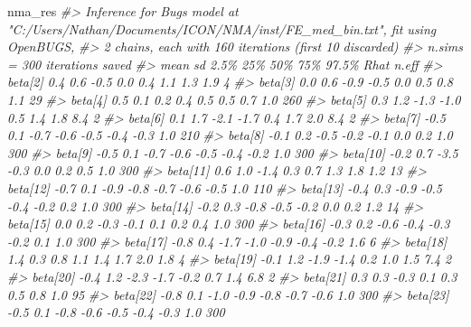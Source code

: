 \documentclass[
]{article}
\newenvironment{Shaded}{\begin{snugshade}}{\end{snugshade}}
\newcommand{\CommentTok}[1]{\textcolor[rgb]{0.56,0.35,0.01}{\textit{#1}}}
\newcommand{\NormalTok}[1]{#1}
\begin{document}
\begin{Shaded}
\begin{Highlighting}[]
\NormalTok{nma\_res}
\CommentTok{\#\textgreater{} Inference for Bugs model at "C:/Users/Nathan/Documents/ICON/NMA/inst/FE\_med\_bin.txt", fit using OpenBUGS,}
\CommentTok{\#\textgreater{}  2 chains, each with 160 iterations (first 10 discarded)}
\CommentTok{\#\textgreater{}  n.sims = 300 iterations saved}
\CommentTok{\#\textgreater{}            mean    sd  2.5\%   25\%   50\%    75\%  97.5\% Rhat n.eff}
\CommentTok{\#\textgreater{} beta[2]     0.4   0.6  {-}0.5   0.0   0.4    1.1    1.3  1.9     4}
\CommentTok{\#\textgreater{} beta[3]     0.0   0.6  {-}0.9  {-}0.5   0.0    0.5    0.8  1.1    29}
\CommentTok{\#\textgreater{} beta[4]     0.5   0.1   0.2   0.4   0.5    0.5    0.7  1.0   260}
\CommentTok{\#\textgreater{} beta[5]     0.3   1.2  {-}1.3  {-}1.0   0.5    1.4    1.8  8.4     2}
\CommentTok{\#\textgreater{} beta[6]     0.1   1.7  {-}2.1  {-}1.7   0.4    1.7    2.0  8.4     2}
\CommentTok{\#\textgreater{} beta[7]    {-}0.5   0.1  {-}0.7  {-}0.6  {-}0.5   {-}0.4   {-}0.3  1.0   210}
\CommentTok{\#\textgreater{} beta[8]    {-}0.1   0.2  {-}0.5  {-}0.2  {-}0.1    0.0    0.2  1.0   300}
\CommentTok{\#\textgreater{} beta[9]    {-}0.5   0.1  {-}0.7  {-}0.6  {-}0.5   {-}0.4   {-}0.2  1.0   300}
\CommentTok{\#\textgreater{} beta[10]   {-}0.2   0.7  {-}3.5  {-}0.3   0.0    0.2    0.5  1.0   300}
\CommentTok{\#\textgreater{} beta[11]    0.6   1.0  {-}1.4   0.3   0.7    1.3    1.8  1.2    13}
\CommentTok{\#\textgreater{} beta[12]   {-}0.7   0.1  {-}0.9  {-}0.8  {-}0.7   {-}0.6   {-}0.5  1.0   110}
\CommentTok{\#\textgreater{} beta[13]   {-}0.4   0.3  {-}0.9  {-}0.5  {-}0.4   {-}0.2    0.2  1.0   300}
\CommentTok{\#\textgreater{} beta[14]   {-}0.2   0.3  {-}0.8  {-}0.5  {-}0.2    0.0    0.2  1.2    14}
\CommentTok{\#\textgreater{} beta[15]    0.0   0.2  {-}0.3  {-}0.1   0.1    0.2    0.4  1.0   300}
\CommentTok{\#\textgreater{} beta[16]   {-}0.3   0.2  {-}0.6  {-}0.4  {-}0.3   {-}0.2    0.1  1.0   300}
\CommentTok{\#\textgreater{} beta[17]   {-}0.8   0.4  {-}1.7  {-}1.0  {-}0.9   {-}0.4   {-}0.2  1.6     6}
\CommentTok{\#\textgreater{} beta[18]    1.4   0.3   0.8   1.1   1.4    1.7    2.0  1.8     4}
\CommentTok{\#\textgreater{} beta[19]   {-}0.1   1.2  {-}1.9  {-}1.4   0.2    1.0    1.5  7.4     2}
\CommentTok{\#\textgreater{} beta[20]   {-}0.4   1.2  {-}2.3  {-}1.7  {-}0.2    0.7    1.4  6.8     2}
\CommentTok{\#\textgreater{} beta[21]    0.3   0.3  {-}0.3   0.1   0.3    0.5    0.8  1.0    95}
\CommentTok{\#\textgreater{} beta[22]   {-}0.8   0.1  {-}1.0  {-}0.9  {-}0.8   {-}0.7   {-}0.6  1.0   300}
\CommentTok{\#\textgreater{} beta[23]   {-}0.5   0.1  {-}0.8  {-}0.6  {-}0.5   {-}0.4   {-}0.3  1.0   300}

\end{Highlighting}
\end{Shaded}
\end{document}
